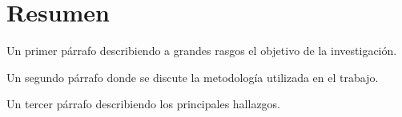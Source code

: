 \chapter*{Resumen}

Un primer párrafo describiendo a grandes rasgos el objetivo de la investigación. 

Un segundo párrafo donde se discute la metodología utilizada en el trabajo. 

Un tercer párrafo describiendo los principales hallazgos. 
